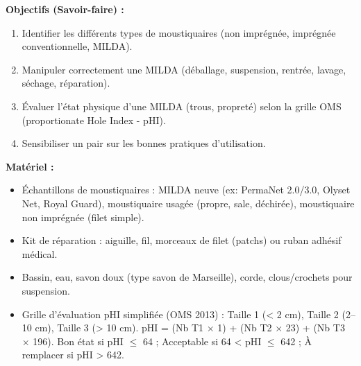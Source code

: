\documentclass[11pt]{article}
\begin{document}
\begin{experience}
\textbf{Objectifs (Savoir-faire) :}
\begin{enumerate}
    \item Identifier les différents types de moustiquaires (non imprégnée, imprégnée conventionnelle, MILDA).
    \item Manipuler correctement une MILDA (déballage, suspension, rentrée, lavage, séchage, réparation).
    \item Évaluer l'état physique d'une MILDA (trous, propreté) selon la grille OMS (proportionate Hole Index - pHI).
    \item Sensibiliser un pair sur les bonnes pratiques d'utilisation.
\end{enumerate}

\textbf{Matériel :}
\begin{itemize}
    \item Échantillons de moustiquaires : MILDA neuve (ex: PermaNet 2.0/3.0, Olyset Net, Royal Guard), moustiquaire usagée (propre, sale, déchirée), moustiquaire non imprégnée (filet simple).
    \item Kit de réparation : aiguille, fil, morceaux de filet (patchs) ou ruban adhésif médical.
    \item Bassin, eau, savon doux (type savon de Marseille), corde, clous/crochets pour suspension.
    \item Grille d'évaluation pHI simplifiée (OMS 2013) : Taille 1 (< 2 cm), Taille 2 (2--10 cm), Taille 3 (> 10 cm). pHI = (Nb T1 $\times$ 1) + (Nb T2 $\times$ 23) + (Nb T3 $\times$ 196). Bon état si pHI $\le$ 64 ; Acceptable si 64 < pHI $\le$ 642 ; À remplacer si pHI > 642.
\end{itemize}


\end{experience}
\end{document}
